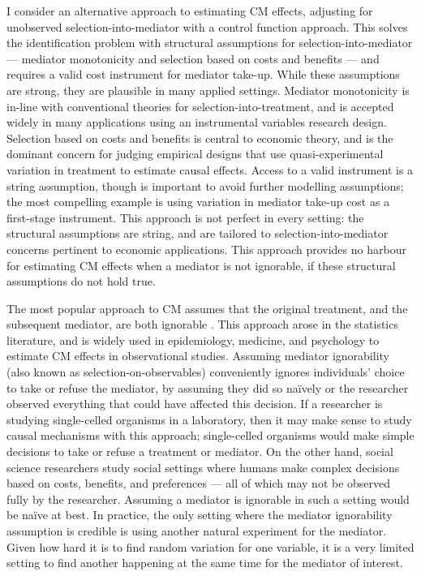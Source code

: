 I consider an alternative approach to estimating CM effects, adjusting for unobserved selection-into-mediator with a control function approach.
This solves the identification problem with structural assumptions for selection-into-mediator --- mediator monotonicity and selection based on costs and benefits --- and requires a valid cost instrument for mediator take-up.
While these assumptions are strong, they are plausible in many applied settings.
Mediator monotonicity is in-line with conventional theories for selection-into-treatment, and is accepted widely in many applications using an instrumental variables research design.
Selection based on costs and benefits is central to economic theory, and is the dominant concern for judging empirical designs that use quasi-experimental variation in treatment to estimate causal effects.
Access to a valid instrument is a string assumption, though is important to avoid further modelling assumptions; the most compelling example is using variation in mediator take-up cost as a first-stage instrument.
This approach is not perfect in every setting: the structural assumptions are string, and are tailored to selection-into-mediator concerns pertinent to economic applications.
This approach provides no harbour for estimating CM effects when a mediator is not ignorable, if these structural assumptions do not hold true.

The most popular approach to CM assumes that the original treatment, and the subsequent mediator, are both ignorable \citep{imai2010identification}.
This approach arose in the statistics literature, and is widely used in epidemiology, medicine, and psychology to estimate CM effects in observational studies.
Assuming mediator ignorability (also known as selection-on-observables) conveniently ignores individuals' choice to take or refuse the mediator, by assuming they did so na\"ively or the researcher observed everything that could have affected this decision.
If a researcher is studying single-celled organisms in a laboratory, then it may make sense to study causal mechanisms with this approach; single-celled organisms would make simple decisions to take or refuse a treatment or mediator.
On the other hand, social science researchers study social settings where humans make complex decisions based on costs, benefits, and preferences --- all of which may not be observed fully by the researcher.
Assuming a mediator is ignorable in such a setting would be na\"ive at best.
In practice, the only setting where the mediator ignorability assumption is credible is using another natural experiment for the mediator.
Given how hard it is to find random variation for one variable, it is a very limited setting to find another happening at the same time for the mediator of interest.

